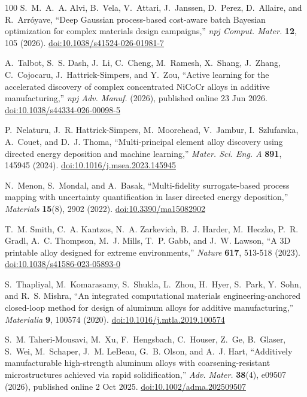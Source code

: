 \documentclass[12pt,letterpaper]{article}
\begin{document}
\begin{thebibliography}{100}
S.~M.~A.~A. Alvi, B.~Vela, V.~Attari, J.~Janssen, D.~Perez, D.~Allaire, and
R.~Arr{\'o}yave, ``Deep Gaussian process-based cost-aware batch Bayesian
optimization for complex materials design campaigns,'' \emph{npj Comput.
Mater.} \textbf{12}, 105 (2026).
\href{https://doi.org/10.1038/s41524-026-01981-7}{doi:10.1038/s41524-026-01981-7}

A.~Talbot, S.~S. Dash, J.~Li, C.~Cheng, M.~Ramesh, X.~Shang, J.~Zhang,
C.~Cojocaru, J.~Hattrick-Simpers, and Y.~Zou, ``Active learning for the
accelerated discovery of complex concentrated NiCoCr alloys in additive
manufacturing,'' \emph{npj Adv. Manuf.} (2026), published online 23 Jun 2026.
\href{https://doi.org/10.1038/s44334-026-00098-5}{doi:10.1038/s44334-026-00098-5}

P.~Nelaturu, J.~R. Hattrick-Simpers, M.~Moorehead, V.~Jambur, I.~Szlufarska, A.~Couet, and D.~J. Thoma, ``Multi-principal element alloy discovery using directed energy deposition and machine learning,'' \emph{Mater. Sci. Eng. A} \textbf{891}, 145945 (2024).
\href{https://doi.org/10.1016/j.msea.2023.145945}{doi:10.1016/j.msea.2023.145945}

N.~Menon, S.~Mondal, and A.~Basak, ``Multi-fidelity surrogate-based process mapping with uncertainty quantification in laser directed energy deposition,'' \emph{Materials} \textbf{15}(8), 2902 (2022).
\href{https://doi.org/10.3390/ma15082902}{doi:10.3390/ma15082902}

T.~M. Smith, C.~A. Kantzos, N.~A. Zarkevich, B.~J. Harder, M.~Heczko, P.~R. Gradl, A.~C. Thompson, M.~J. Mills, T.~P. Gabb, and J.~W. Lawson, ``A 3D printable alloy designed for extreme environments,'' \emph{Nature} \textbf{617}, 513-518 (2023).
\href{https://doi.org/10.1038/s41586-023-05893-0}{doi:10.1038/s41586-023-05893-0}

S.~Thapliyal, M.~Komarasamy, S.~Shukla, L.~Zhou, H.~Hyer, S.~Park, Y.~Sohn,
and R.~S. Mishra, ``An integrated computational materials engineering-anchored
closed-loop method for design of aluminum alloys for additive
manufacturing,'' \emph{Materialia} \textbf{9}, 100574 (2020).
\href{https://doi.org/10.1016/j.mtla.2019.100574}{doi:10.1016/j.mtla.2019.100574}

S.~M. Taheri-Mousavi, M.~Xu, F.~Hengsbach, C.~Houser, Z.~Ge, B.~Glaser,
S.~Wei, M.~Schaper, J.~M. LeBeau, G.~B. Olson, and A.~J. Hart, ``Additively
manufacturable high-strength aluminum alloys with coarsening-resistant
microstructures achieved via rapid solidification,'' \emph{Adv. Mater.}
\textbf{38}(4), e09507 (2026), published online 2 Oct 2025.
\href{https://doi.org/10.1002/adma.202509507}{doi:10.1002/adma.202509507}


\end{thebibliography}
\end{document}
